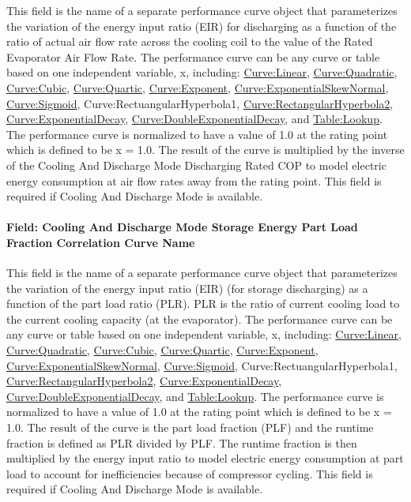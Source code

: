 This field is the name of a separate performance curve object that parameterizes the variation of the energy input ratio (EIR) for discharging as a function of the ratio of actual air flow rate across the cooling coil to the value of the Rated Evaporator Air Flow Rate. The performance curve can be any curve or table based on one independent variable, x, including: \hyperref[curvelinear]{Curve:Linear}, \hyperref[curvequadratic]{Curve:Quadratic}, \hyperref[curvecubic]{Curve:Cubic}, \hyperref[curvequartic]{Curve:Quartic}, \hyperref[curveexponent]{Curve:Exponent}, \hyperref[curveexponentialskewnormal]{Curve:ExponentialSkewNormal}, \hyperref[curvesigmoid]{Curve:Sigmoid}, Curve:RectuangularHyperbola1, \hyperref[curverectangularhyperbola2]{Curve:RectangularHyperbola2}, \hyperref[curveexponentialdecay]{Curve:ExponentialDecay}, \hyperref[curvedoubleexponentialdecay]{Curve:DoubleExponentialDecay}, and \hyperref[tablelookup]{Table:Lookup}. The performance curve is normalized to have a value of 1.0 at the rating point which is defined to be x = 1.0. The result of the curve is multiplied by the inverse of the Cooling And Discharge Mode Discharging Rated COP to model electric energy consumption at air flow rates away from the rating point. This field is required if Cooling And Discharge Mode is available.

\paragraph{Field: Cooling And Discharge Mode Storage Energy Part Load Fraction Correlation Curve Name}\label{field-cooling-and-discharge-mode-storage-energy-part-load-fraction-correlation-curve-name}

This field is the name of a separate performance curve object that parameterizes the variation of the energy input ratio (EIR) (for storage discharging) as a function of the part load ratio (PLR). PLR is the ratio of current cooling load to the current cooling capacity (at the evaporator). The performance curve can be any curve or table based on one independent variable, x, including: \hyperref[curvelinear]{Curve:Linear}, \hyperref[curvequadratic]{Curve:Quadratic}, \hyperref[curvecubic]{Curve:Cubic}, \hyperref[curvequartic]{Curve:Quartic}, \hyperref[curveexponent]{Curve:Exponent}, \hyperref[curveexponentialskewnormal]{Curve:ExponentialSkewNormal}, \hyperref[curvesigmoid]{Curve:Sigmoid}, Curve:RectuangularHyperbola1, \hyperref[curverectangularhyperbola2]{Curve:RectangularHyperbola2}, \hyperref[curveexponentialdecay]{Curve:ExponentialDecay}, \hyperref[curvedoubleexponentialdecay]{Curve:DoubleExponentialDecay}, and \hyperref[tablelookup]{Table:Lookup}. The performance curve is normalized to have a value of 1.0 at the rating point which is defined to be x = 1.0. The result of the curve is the part load fraction (PLF) and the runtime fraction is defined as PLR divided by PLF. The runtime fraction is then multiplied by the energy input ratio to model electric energy consumption at part load to account for inefficiencies because of compressor cycling. This field is required if Cooling And Discharge Mode is available.

